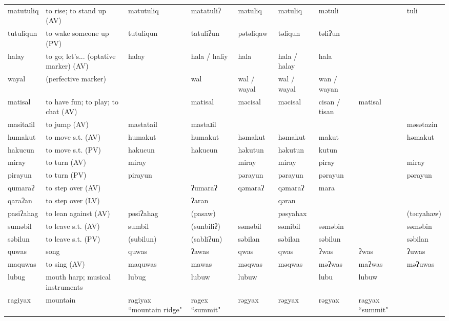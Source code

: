 \begin{landscape}
\begin{longtable}{*{9}{>{\raggedright\arraybackslash}p{}}}
\text{*}matutuliq & to rise; to stand up (AV) & mətutuliq & matatuliʔ & mətuliq & mətuliq & mətuli &  & tuli\\
\text{*}tutuliqun & to wake someone up (PV) & tutuliqun & tatuliʔun & pətəliqaw & təliqun & təliʔun &  & \\
\text{*}halay & to go; let's... (optative marker) (AV) & halay & hala / haliy & hala & hala / halay & hala &  & \\
\text{*}wayal & (perfective marker) &  & wal & wal / wayal & wal / wayal & wan / wayan &  & \\
\text{*}matisal & to have fun; to play; to chat (AV) &  & matisal & məcisal & məcisal & cisan / tisan & matisal & \\
\text{*}masitaɹil & to jump (AV) & mastatail & mastaɹil &  &  &  &  & məsətazin\\
\text{*}humakut & to move s.t. (AV) & humakut & humakut & həmakut & həmakut & makut &  & həmakut\\
\text{*}hakucun & to move s.t. (PV) & hakucun & hakucun & həkutun & həkutun & kutun &  & \\
\text{*}miray & to turn (AV) & miray &  & miray & miray & piray &  & miray\\
\text{*}pirayun & to turn (PV) & pirayun &  & pərayun & pərayun & pərayun &  & pərayun\\
\text{*}qumaraʔ & to step over (AV) &  & ʔumaraʔ & qəmaraʔ & qəmaraʔ & mara &  & \\
\text{*}qaraʔan & to step over (LV) &  & ʔaran &  & qəran &  &  & \\
\text{*}pasiʔahag & to lean against (AV) & pəsiʔahag & (pasaw) &  & pəsyahax &  &  & (təcyahaw)\\
\text{*}suməbil & to leave s.t. (AV) & sumbil & (sunbiliʔ) & səməbil & səmibil & səməbin &  & səməbin\\
\text{*}səbilun & to leave s.t. (PV) & (subilun) & (sabliʔun) & səbilan & səbilan & səbilun &  & səbilan\\
\text{*}quwas & song & quwas & ʔawas & qwas & qwas & ʔwas & ʔwas & ʔuwas\\
\text{*}maquwas & to sing (AV) & maquwas & mawas & məqwas & məqwas & məʔwas & maʔwas & məʔuwas\\
\text{*}lubug & mouth harp; musical instruments & lubug & lubuw & lubuw &  & lubu & lubuw & \\
\text{*}ragiyax & mountain & ragiyax ``mountain ridge" & ragex \newline ``summit" & rəgyax & rəgyax & rəgyax & ragyax \newline ``summit" & \\

\end{longtable}
\end{landscape}
